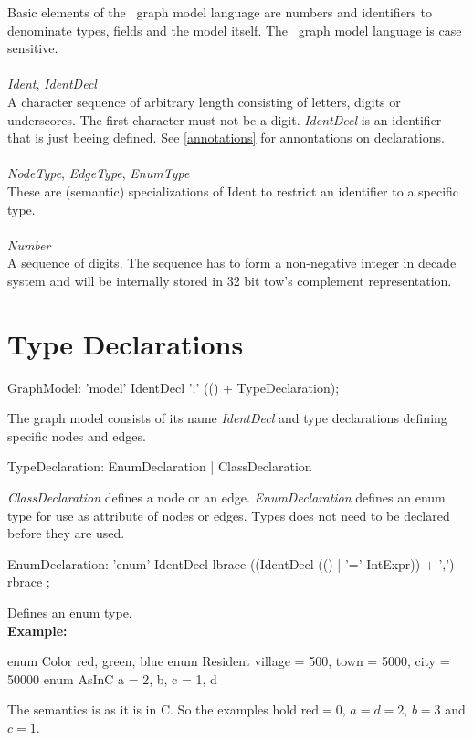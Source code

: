 Basic elements of the \GrG\ graph model language are numbers and identifiers to denominate types, fields and the model itself. The \GrG\ graph model language is case sensitive.\\
\\
\emph{Ident}, \emph{IdentDecl}\\ \nopagebreak
A character sequence of arbitrary length consisting of letters, digits or underscores. The first character must not be a digit. \emph{IdentDecl} is an identifier that is just beeing defined. See \ref{annotations} for annontations on declarations.\\
\\
\emph{NodeType}, \emph{EdgeType}, \emph{EnumType}\\ \nopagebreak
These are (semantic) specializations of Ident to restrict an identifier to a specific type.\\
\\
\emph{Number}\\ \nopagebreak
A sequence of digits. The sequence has to form a non-negative integer in decade system and will be internally stored in 32 bit tow's complement representation.

\section{Type Declarations}
\begin{rail}
  GraphModel: 'model' IdentDecl ';' (() + TypeDeclaration);
\end{rail}
The graph model consists of its name \emph{IdentDecl} and type declarations defining specific nodes and edges.

\begin{rail}
  TypeDeclaration: EnumDeclaration | ClassDeclaration
\end{rail}
\emph{ClassDeclaration} defines a node or an edge. \emph{EnumDeclaration} defines an enum type for use as attribute of nodes or edges. Types does not need to be declared before they are used.

\begin{rail}
  EnumDeclaration: 'enum' IdentDecl lbrace ((IdentDecl (() | '=' IntExpr)) + ',') rbrace ;
\end{rail}
Defines an enum type.\\
{\small \textbf{Example:}}
\begin{grgen}
enum Color {red, green, blue}
enum Resident {village = 500, town = 5000, city = 50000}
enum AsInC {a = 2, b, c = 1, d}
\end{grgen}
{\small The semantics is as it is in C. So the examples hold $\text{red} = 0$, $a=d=2$, $b=3$ and $c=1$.}

